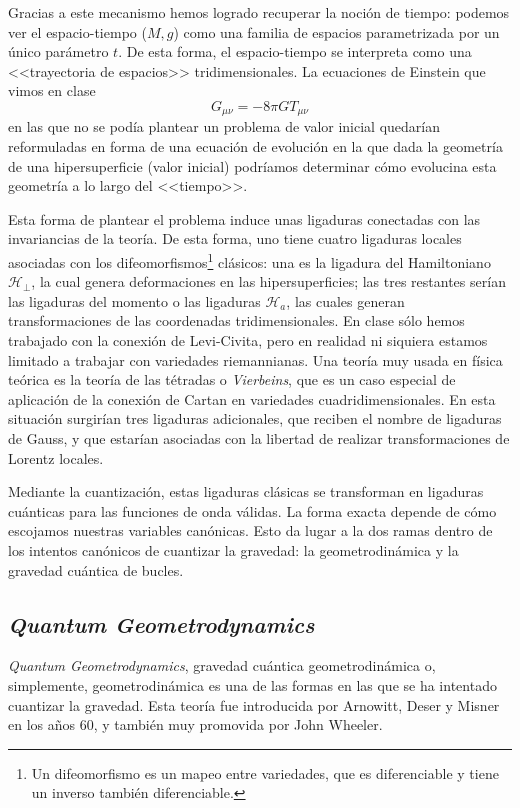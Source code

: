 \documentclass[11pt,a4paper,titlepage]{article}
\begin{document}
Gracias a este mecanismo hemos logrado recuperar la noción de tiempo: podemos ver el espacio-tiempo ($M,g$) como una familia de espacios parametrizada por un único parámetro $t$. De esta forma, el espacio-tiempo se interpreta como una <<trayectoria de espacios>> tridimensionales. La ecuaciones de Einstein que vimos en clase
\begin{equation*}
 G_{\mu\nu}=-8\pi GT_{\mu\nu}
\end{equation*}
en las que no se podía plantear un problema de valor inicial quedarían reformuladas en forma de una ecuación de evolución en la que dada la geometría de una hipersuperficie (valor inicial) podríamos determinar cómo evolucina esta geometría a lo largo del <<tiempo>>.

Esta forma de plantear el problema induce unas ligaduras conectadas con las invariancias de la teoría. De esta forma, uno tiene cuatro ligaduras locales asociadas con los difeomorfismos\footnote{Un difeomorfismo \cite{difeomorfismo} es un mapeo entre variedades, que es diferenciable y tiene un inverso también diferenciable.} clásicos: una es la ligadura del Hamiltoniano $\mathscr{H}_\perp$, la cual genera deformaciones en las hipersuperficies; las tres restantes serían las ligaduras del momento o las ligaduras $\mathscr{H}_a$, las cuales generan transformaciones de las coordenadas tridimensionales. En clase sólo hemos trabajado con la conexión de Levi-Civita, pero en realidad ni siquiera estamos limitado a trabajar con variedades riemannianas. Una teoría muy usada en física teórica es la teoría de las tétradas o \emph{Vierbeins}, que es un caso especial de aplicación de la conexión de Cartan en variedades cuadridimensionales. En esta situación surgirían tres ligaduras adicionales, que reciben el nombre de ligaduras de Gauss, y que estarían asociadas con la libertad de realizar transformaciones de Lorentz locales.

Mediante la cuantización, estas ligaduras clásicas se transforman en ligaduras cuánticas para las funciones de onda válidas. La forma exacta depende de cómo escojamos nuestras variables canónicas. Esto da lugar a la dos ramas dentro de los intentos canónicos de cuantizar la gravedad: la geometrodinámica y la gravedad cuántica de bucles.


\subsection{\textit{Quantum Geometrodynamics}}

\textit{Quantum Geometrodynamics}, gravedad cuántica geometrodinámica o, simplemente, geometrodinámica es una de las formas en las que se ha intentado cuantizar la gravedad. Esta teoría fue introducida por Arnowitt, Deser y Misner en los años 60, y también muy promovida por John Wheeler.
\end{document}
